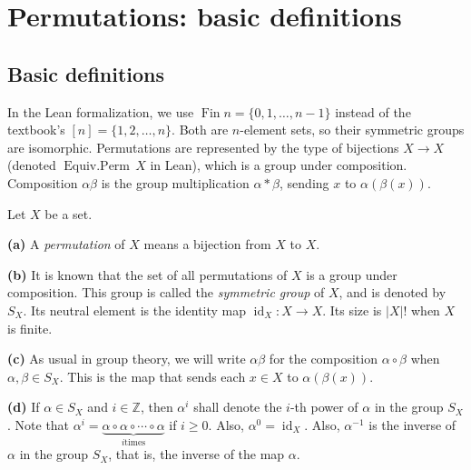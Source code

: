 \section{Permutations: basic definitions}

\subsection{Basic definitions}

\begin{convention}
In the Lean formalization, we use $\operatorname{Fin} n = \{0, 1, \ldots, n-1\}$
instead of the textbook's $[n] = \{1, 2, \ldots, n\}$.  Both are $n$-element sets,
so their symmetric groups are isomorphic.  Permutations are represented by
the type of bijections $X \to X$ (denoted $\operatorname{Equiv.Perm}\, X$ in Lean), which is a
group under composition.  Composition $\alpha\beta$ is the group
multiplication $\alpha * \beta$, sending $x$ to $\alpha(\beta(x))$.
\end{convention}

\begin{definition}
\label{def.perm.perm}
\leantarget
\leanok
Let $X$ be a set.

\textbf{(a)} A \emph{permutation} of $X$ means a bijection from $X$ to $X$.

\textbf{(b)} It is known that the set of all permutations of $X$ is a group
under composition. This group is called the \emph{symmetric group} of $X$, and
is denoted by $S_X$. Its neutral element is the identity map
$\operatorname{id}_X : X \to X$. Its size is $|X|!$ when $X$ is finite.

\textbf{(c)} As usual in group theory, we will write $\alpha\beta$ for the
composition $\alpha \circ \beta$ when $\alpha, \beta \in S_X$. This is the map
that sends each $x \in X$ to $\alpha(\beta(x))$.

\textbf{(d)} If $\alpha \in S_X$ and $i \in \mathbb{Z}$, then $\alpha^i$
shall denote the $i$-th power of $\alpha$ in the group $S_X$. Note that
$\alpha^i = \underbrace{\alpha \circ \alpha \circ \cdots \circ \alpha}_{i\text{
times}}$ if $i \ge 0$. Also, $\alpha^0 = \operatorname{id}_X$.
Also, $\alpha^{-1}$ is the inverse of $\alpha$ in the group $S_X$, that is,
the inverse of the map $\alpha$.
\end{definition}

